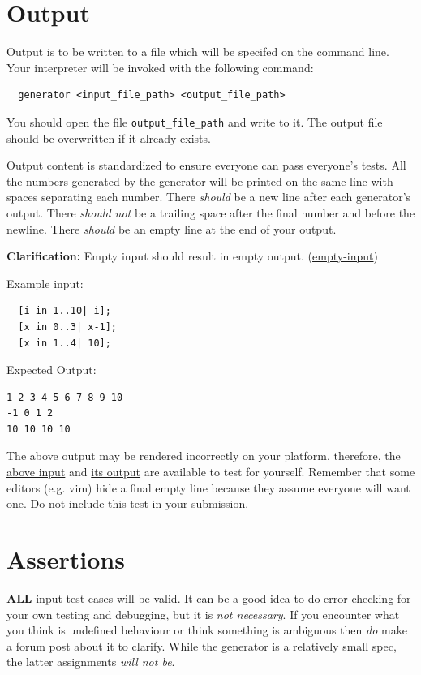 \documentclass{article}
\newcommand{\code}[1]{\texttt{\textmd{#1}}}
\newcommand{\clarification}[2]{\textbf{Clarification: }#1 (\hyperlink{#2}{#2})}
\begin{document}
\section{Output}
Output is to be written to a file which will be specifed on the command line. Your interpreter
will be invoked with the following command:
\begin{lstlisting}
  generator <input_file_path> <output_file_path>
\end{lstlisting}
You should open the file \code{output\_file\_path} and write to it. The output file should be
overwritten if it already exists.

Output content is standardized to ensure everyone can pass everyone's tests. All the numbers
generated by the generator will be printed on the same line with spaces separating each number.
There \textit{should} be a new line after each generator's output. There \textit{should not} be a
trailing space after the final number and before the newline. There \textit{should} be an empty
line at the end of your output.

\clarification{Empty input should result in empty output.}{empty-input}

Example input:
\begin{lstlisting}
  [i in 1..10| i];
  [x in 0..3| x-1];
  [x in 1..4| 10];
\end{lstlisting}

Expected Output:
\begin{lstlisting}
1 2 3 4 5 6 7 8 9 10
-1 0 1 2
10 10 10 10
\end{lstlisting}

The above output may be rendered incorrectly on your platform, therefore, the
\href{https://webdocs.cs.ualberta.ca/\%7Ec415/generator/static/ex.in} {above input} and
\href{https://webdocs.cs.ualberta.ca/\%7Ec415/generator/static/ex.out} {its output} are available
to test for yourself. Remember that some editors (e.g. vim) hide a final empty line because they
assume everyone will want one. Do not include this test in your submission.

\section{Assertions}
\textbf{ALL} input test cases will be valid. It can be a good idea to do error checking for your
own testing and debugging, but it is \textit{not necessary}. If you encounter what you think is
undefined behaviour or think something is ambiguous then \textit{do} make a forum post about it to
clarify. While the generator is a relatively small spec, the latter assignments \textit{will not
be}.
\end{document}
